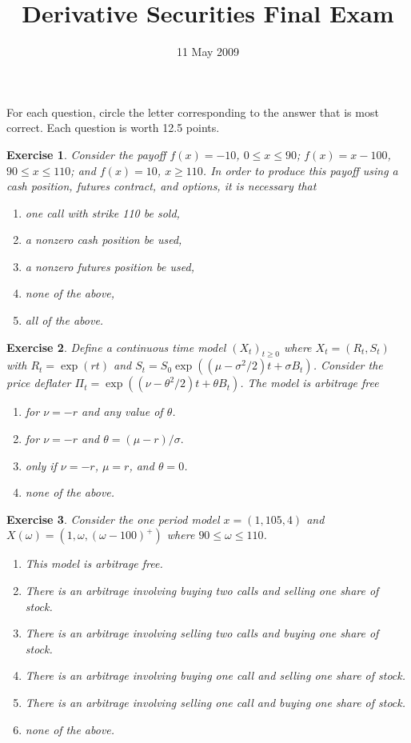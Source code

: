 \documentclass[11pt,fleqn]{amsproc}
\newtheorem{xca}{Exercise}
\begin{document}
\title{Derivative Securities Final Exam}
\author{11 May 2009}

\maketitle

For each question, circle the letter corresponding to the answer that is most correct. Each question is worth 12.5 points.

\begin{xca}
Consider the payoff $f(x) = -10$, $0 \le x \le 90$; $f(x) = x - 100$, $90 \le x \le 110$; and $f(x) = 10$, $x \ge 110$. In order to produce
this payoff using a cash position, futures contract, and options, it is necessary that
\begin{enumerate}
\item one call with strike 110 be sold,
\item a nonzero cash position be used,
\item a nonzero futures position be used,
\item none of the above,
\item all of the above.
\end{enumerate}
\end{xca}

\begin{xca}
Define a continuous time model $(X_t)_{t\ge0}$ where $X_t = (R_t, S_t)$ with $R_t = \exp(rt)$ and
$S_t = S_0\exp((\mu - \sigma^2/2)t + \sigma B_t)$. Consider the price deflater $\Pi_t = \exp((\nu - \theta^2/2)t
+ \theta B_t)$. The model is arbitrage free
\begin{enumerate}
\item for $\nu = -r$ and any value of $\theta$.
\item for $\nu = -r$ and $\theta = (\mu - r)/\sigma.$
\item only if $\nu = -r$, $\mu = r$, and $\theta = 0$.
\item none of the above.
\end{enumerate}

\end{xca}

\begin{xca}
Consider the one period model $x = (1, 105, 4)$ and $X(\omega) = (1, \omega, (\omega - 100)^+)$ where $90\le\omega\le 110$.
\begin{enumerate}
\item This model is arbitrage free.
\item There is an arbitrage involving buying two calls and selling one share of stock.
\item There is an arbitrage involving selling two calls and buying one share of stock.
\item There is an arbitrage involving buying one call and selling one share of stock.
\item There is an arbitrage involving selling one call and buying one share of stock.
\item none of the above.
\end{enumerate}
\end{xca}
\end{document}
